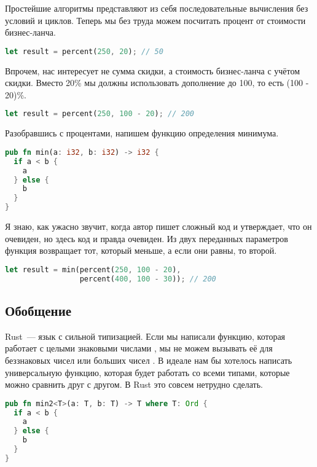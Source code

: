 Простейшие алгоритмы представляют из себя последовательные вычисления без условий и циклов.
Теперь мы без труда можем посчитать процент от стоимости бизнес-ланча.

\begin{lstlisting}[language=Rust]
let result = percent(250, 20); // 50
\end{lstlisting}


Впрочем, нас интересует не сумма скидки, а стоимость бизнес-ланча с учётом скидки.
Вместо 20\% мы должны использовать дополнение до 100, то есть (100 - 20)\%.

\begin{lstlisting}[language=Rust]
let result = percent(250, 100 - 20); // 200
\end{lstlisting}

Разобравшись с процентами, напишем функцию определения минимума.

\begin{lstlisting}[language=Rust]
pub fn min(a: i32, b: i32) -> i32 {
  if a < b {
    a
  } else {
    b
  }
}
\end{lstlisting}

Я знаю, как ужасно звучит, когда автор пишет сложный код и утверждает, что он очевиден, но здесь код и правда очевиден.
Из двух переданных параметров функция  возвращает тот, который меньше, а если они равны, то второй.

\begin{lstlisting}[language=Rust]
let result = min(percent(250, 100 - 20),
                 percent(400, 100 - 30)); // 200
\end{lstlisting}

\subsection{Обобщение}

Rust~--- язык с сильной типизацией.
Если мы написали функцию, которая работает с целыми знаковыми числами , мы не можем вызывать её для беззнаковых чисел  или больших чисел .
В идеале нам бы хотелось написать универсальную функцию, которая будет работать со всеми типами, которые можно сравнить друг с другом.
В Rust это совсем нетрудно сделать.

\begin{lstlisting}[language=Rust]
pub fn min2<T>(a: T, b: T) -> T where T: Ord {
  if a < b {
    a
  } else {
    b
  }
}
\end{lstlisting}

